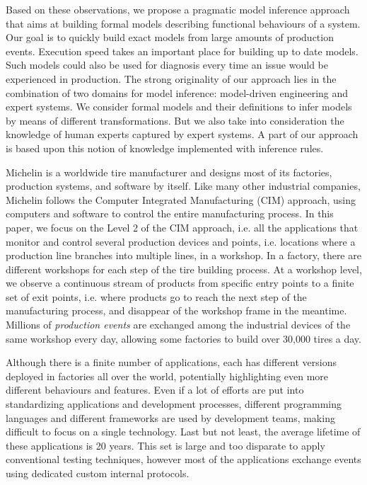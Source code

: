 Based on these observations, we propose a pragmatic model
inference approach that aims at building formal models describing
functional behaviours of a system. Our goal is to quickly build
exact models from large amounts of production events. Execution
speed takes an important place for building up to date models.
Such models could also be used for diagnosis every time an issue
would be experienced in production. The strong originality of our
approach lies in the combination of two domains for model
inference: model-driven engineering and expert systems. We
consider formal models and their definitions to infer models by
means of different transformations. But we also take into
consideration the knowledge of human experts captured by expert
systems. A part of our approach is based upon this notion of
knowledge implemented with inference rules.

Michelin is a worldwide tire manufacturer and designs most of its
factories, production systems, and software by itself.  Like
many other industrial companies, Michelin follows the Computer
Integrated Manufacturing (CIM) approach, using computers and
software to control the entire manufacturing process. In this
paper, we focus on the Level 2 of the CIM approach, i.e. all the
applications that monitor and control several production devices
and points, i.e. locations where a production line branches into
multiple lines, in a workshop. In a factory, there are different
workshops for each step of the tire building process. At a
workshop level, we observe a continuous stream of products from
specific entry points to a finite set of exit points, i.e. where
products go to reach the next step of the manufacturing process,
and disappear of the workshop frame in the meantime. Millions of
\emph{production events} are exchanged among the industrial
devices of the same workshop every day, allowing some factories
to build over 30,000 tires a day.

Although there is a finite number of applications, each has
different versions deployed in factories all over the world,
potentially highlighting even more different behaviours and
features. Even if a lot of efforts are put into standardizing
applications and development processes, different programming
languages and different frameworks are used by development
teams, making difficult to focus on a single technology. Last
but not least, the average lifetime of these applications is 20
years. This set is large and too disparate to apply conventional
testing techniques, however most of the applications exchange
events using dedicated custom internal protocols.

